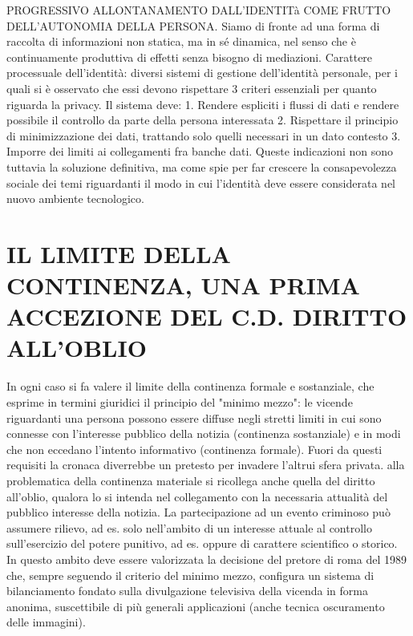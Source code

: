 PROGRESSIVO ALLONTANAMENTO DALL’IDENTITà COME FRUTTO DELL’AUTONOMIA DELLA PERSONA.
Siamo di fronte ad una forma di raccolta di informazioni non statica, ma in sé dinamica, nel senso che è continuamente produttiva di effetti senza bisogno di mediazioni.
Carattere processuale dell’identità: diversi sistemi di gestione dell’identità personale, per i quali si è osservato che essi devono rispettare 3 criteri essenziali per quanto riguarda la privacy. Il sistema deve:
1.	Rendere espliciti i flussi di dati e rendere possibile il controllo da parte della persona interessata
2.	Rispettare il principio di minimizzazione dei dati, trattando solo quelli necessari in un dato contesto
3.	Imporre dei limiti ai collegamenti fra banche dati.
Queste indicazioni non sono tuttavia la soluzione definitiva, ma come spie per far crescere la consapevolezza sociale dei temi riguardanti il modo in cui l’identità deve essere considerata nel nuovo ambiente tecnologico.

\section{IL LIMITE DELLA CONTINENZA, UNA PRIMA ACCEZIONE DEL C.D. DIRITTO ALL'OBLIO}
In ogni caso si fa valere il limite della continenza formale e sostanziale, che esprime in termini giuridici il principio del "minimo mezzo": le vicende riguardanti una persona possono essere diffuse negli stretti limiti in cui sono connesse con l'interesse pubblico della notizia (continenza sostanziale) e in modi che non eccedano l'intento informativo (continenza formale). Fuori da questi requisiti la cronaca diverrebbe un pretesto per invadere l'altrui sfera privata.
alla problematica della continenza materiale si ricollega anche quella del diritto all'oblio, qualora lo si intenda nel collegamento con la necessaria attualità del pubblico interesse della notizia. La partecipazione ad un evento criminoso
può assumere rilievo, ad es. solo nell'ambito di un interesse attuale al controllo sull'esercizio del potere punitivo, ad es. oppure di carattere scientifico o storico.
In questo ambito deve essere valorizzata la decisione del pretore di roma del 1989 che, sempre seguendo il criterio del minimo mezzo, configura un sistema di bilanciamento fondato sulla divulgazione televisiva della vicenda in forma anonima, suscettibile di più generali applicazioni (anche tecnica oscuramento delle immagini).

